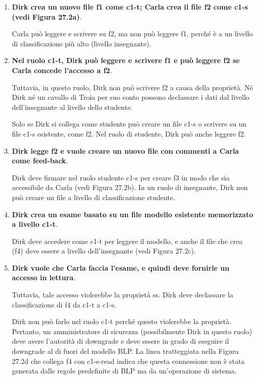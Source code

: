\begin{enumerate}
    \item \textbf{Dirk crea un nuovo file f1 come c1-t; Carla crea il file f2 come c1-s (vedi Figura 27.2a)}.
    
Carla può leggere e scrivere su f2, ma non può leggere f1, perché è a un livello di classificazione più alto (livello insegnante).

    \item \textbf{Nel ruolo c1-t, Dirk può leggere e scrivere f1 e può leggere f2 se Carla concede l'accesso a f2}. 
    
Tuttavia, in questo ruolo, Dirk non può scrivere f2 a causa della proprietà. Né Dirk né un cavallo di Troia per suo conto possono declassare i dati dal livello dell'insegnante al livello dello studente.

\singlespacing

Solo se Dirk si collega come studente può creare un file c1-s o scrivere su un file c1-s esistente, come f2. Nel ruolo di studente, Dirk può anche leggere f2.

    \item \textbf{Dirk legge f2 e vuole creare un nuovo file con commenti a Carla come feed-back}.

Dirk deve firmare nel ruolo studente c1-s per creare f3 in modo che sia accessibile da Carla (vedi Figura 27.2b). In un ruolo di insegnante, Dirk non può creare un file a livello di classificazione studente.

    \item \textbf{Dirk crea un esame basato su un file modello esistente memorizzato a livello c1-t}.
    
Dirk deve accedere come c1-t per leggere il modello, e anche il file che crea (f4) deve essere a livello dell'insegnante (vedi Figura 27.2c).

    \item \textbf{Dirk vuole che Carla faccia l'esame, e quindi deve fornirle un accesso in lettura}.
    
Tuttavia, tale accesso violerebbe la proprietà ss. Dirk deve declassare la classificazione di f4 da c1-t a c1-s.

\singlespacing

Dirk non può farlo nel ruolo c1-t perché questo violerebbe la proprietà. Pertanto, un amministratore di sicurezza (possibilmente Dirk in questo ruolo) deve avere l'autorità di downgrade e deve essere in grado di eseguire il downgrade al di fuori del modello BLP. La linea tratteggiata nella Figura 27.2d che collega f4 con c1-s-read indica che questa connessione non è stata generata dalle regole predefinite di BLP ma da un'operazione di sistema.


\end{enumerate}
